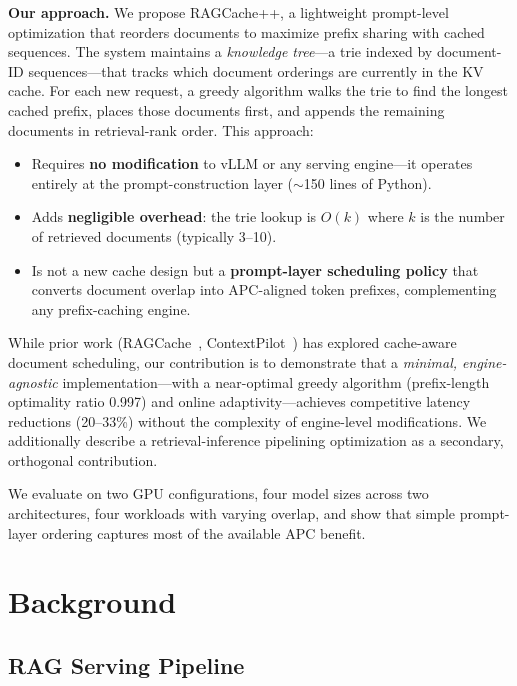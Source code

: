 \documentclass{article}
\begin{document}
\textbf{Our approach.} We propose RAGCache++, a lightweight prompt-level optimization that reorders documents to maximize prefix sharing with cached sequences. The system maintains a \emph{knowledge tree}---a trie indexed by document-ID sequences---that tracks which document orderings are currently in the KV cache. For each new request, a greedy algorithm walks the trie to find the longest cached prefix, places those documents first, and appends the remaining documents in retrieval-rank order. This approach:
\begin{itemize}
\item Requires \textbf{no modification} to vLLM or any serving engine---it operates entirely at the prompt-construction layer (${\sim}$150 lines of Python).
\item Adds \textbf{negligible overhead}: the trie lookup is $O(k)$ where $k$ is the number of retrieved documents (typically 3--10).
\item Is not a new cache design but a \textbf{prompt-layer scheduling policy} that converts document overlap into APC-aligned token prefixes, complementing any prefix-caching engine.
\end{itemize}
While prior work (RAGCache~\citep{jin2025ragcache}, ContextPilot~\citep{contextpilot2025}) has explored cache-aware document scheduling, our contribution is to demonstrate that a \emph{minimal, engine-agnostic} implementation---with a near-optimal greedy algorithm (prefix-length optimality ratio 0.997) and online adaptivity---achieves competitive latency reductions (20--33\%) without the complexity of engine-level modifications. We additionally describe a retrieval-inference pipelining optimization as a secondary, orthogonal contribution.

We evaluate on two GPU configurations, four model sizes across two architectures, four workloads with varying overlap, and show that simple prompt-layer ordering captures most of the available APC benefit.

\section{Background}
\label{sec:background}

\subsection{RAG Serving Pipeline}
\end{document}
